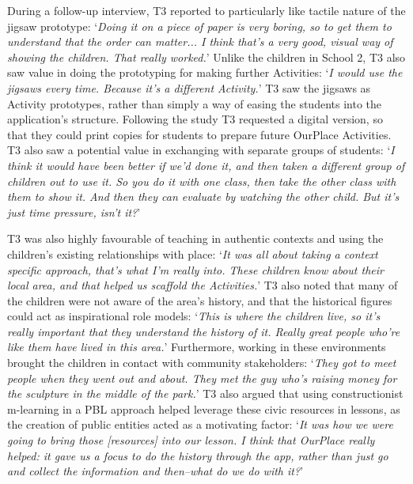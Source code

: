 During a follow-up interview, T3 reported to particularly like tactile nature of the jigsaw prototype: `\textit{Doing it on a piece of paper is very boring, so to get them to understand that the order can matter... I think that's a very good, visual way of showing the children. That really worked.}' Unlike the children in School 2, T3 also saw value in doing the prototyping for making further Activities: `\textit{I would use the jigsaws every time. Because it's a different Activity.}' T3 saw the jigsaws as Activity prototypes, rather than simply a way of easing the students into the application's structure. Following the study T3 requested a digital version, so that they could print copies for students to prepare future OurPlace Activities. T3 also saw a potential value in exchanging with separate groups of students: `\textit{I think it would have been better if we'd done it, and then taken a different group of children out to use it. So you do it with one class, then take the other class with them to show it. And then they can evaluate by watching the other child. But it's just time pressure, isn't it?}'

T3 was also highly favourable of teaching in authentic contexts and using the children's existing relationships with place: `\textit{It was all about taking a context specific approach, that's what I'm really into. These children know about their local area, and that helped us scaffold the Activities.}' T3 also noted that many of the children were not aware of the area's history, and that the historical figures could act as inspirational role models: `\textit{This is where the children live, so it's really important that they understand the history of it. Really great people who're like them have lived in this area.}' Furthermore, working in these environments brought the children in contact with community stakeholders: `\textit{They got to meet people when they went out and about. They met the guy who's raising money for the sculpture in the middle of the park.}' T3 also argued that using constructionist m-learning in a PBL approach helped leverage these civic resources in lessons, as the creation of public entities acted as a motivating factor: `\textit{It was how we were going to bring those [resources] into our lesson. I think that OurPlace really helped: it gave us a focus to do the history through the app, rather than just go and collect the information and then--what do we do with it?}' 

